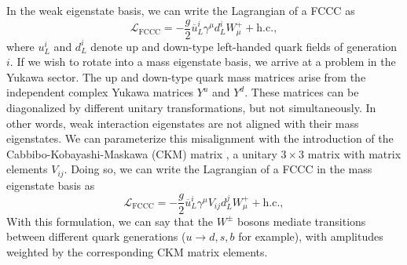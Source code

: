 In the weak eigenstate basis, we can write the Lagrangian of a FCCC as
\begin{equation}\label{eq:fccc_v1}
    \mathcal{L_\mathrm{FCCC}} = -\frac{g}{2}\overline{u}_L^i \gamma^\mu d_L^i W^+_\mu + \mathrm{h.c.},
\end{equation}
where $u_L^i$ and $d_L^i$ denote  up and down-type left-handed quark fields of generation $i$.  If we wish to rotate into a mass eigenstate basis, we arrive at a problem in the Yukawa sector.  The up and down-type quark mass matrices arise from the independent complex Yukawa matrices $Y^u$ and $Y^d$.  These matrices can be diagonalized by different unitary transformations, but not simultaneously.  In other words, weak interaction eigenstates are not aligned with their mass eigenstates.  We can parameterize this misalignment with the introduction of the Cabbibo-Kobayashi-Maskawa (CKM) matrix \cite{PhysRevLett.10.531, 10.1143/PTP.49.652}, a unitary $3\times3$ matrix with matrix elements $V_{ij}$.  Doing so, we can write the Lagrangian of a FCCC in the mass eigenstate basis as
\begin{equation}\label{eq:fccc_v2}
    \mathcal{L_\mathrm{FCCC}} = -\frac{g}{2}\overline{u}_L^i \gamma^\mu V_{ij}d_L^j W^+_\mu + \mathrm{h.c.},
\end{equation}
With this formulation, we can say that the $W^\pm$ bosons mediate transitions between different quark generations ($u\rightarrow d,s,b$ for example), with amplitudes weighted by the corresponding CKM matrix elements.


